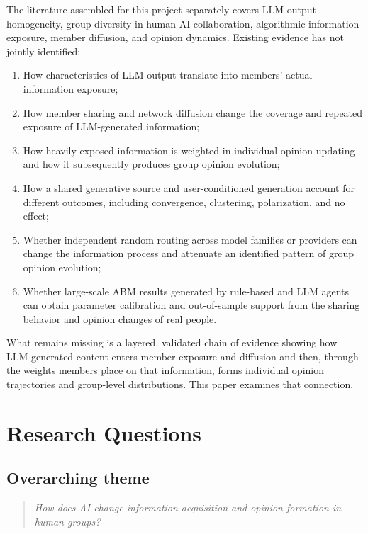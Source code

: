 \documentclass[11pt,a4paper]{article}
\begin{document}
The literature assembled for this project separately covers LLM-output homogeneity, group diversity in human-AI collaboration, algorithmic information exposure, member diffusion, and opinion dynamics. Existing evidence has not jointly identified:

\begin{enumerate}
\item How characteristics of LLM output translate into members' actual information exposure;
\item How member sharing and network diffusion change the coverage and repeated exposure of LLM-generated information;
\item How heavily exposed information is weighted in individual opinion updating and how it subsequently produces group opinion evolution;
\item How a shared generative source and user-conditioned generation account for different outcomes, including convergence, clustering, polarization, and no effect;
\item Whether independent random routing across model families or providers can change the information process and attenuate an identified pattern of group opinion evolution;
\item Whether large-scale ABM results generated by rule-based and LLM agents can obtain parameter calibration and out-of-sample support from the sharing behavior and opinion changes of real people.
\end{enumerate}

What remains missing is a layered, validated chain of evidence showing how LLM-generated content enters member exposure and diffusion and then, through the weights members place on that information, forms individual opinion trajectories and group-level distributions. This paper examines that connection.

\section{Research Questions}

\subsection{Overarching theme}

\begin{quote}\itshape
How does AI change information acquisition and opinion formation in human groups?
\end{quote}
\end{document}
